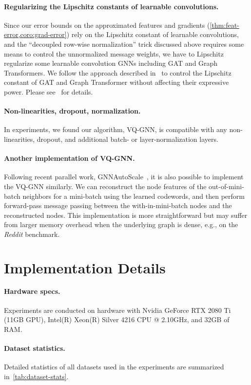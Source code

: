 \documentclass{article}
\newcommand{\cm}{\paragraph}
\begin{document}
\cm{Regularizing the Lipschitz constants of learnable convolutions.}
Since our error bounds on the approximated features and gradients (\cref{thm:feat-error,coro:grad-error}) rely on the Lipschitz constant of learnable convolutions, and the ``decoupled row-wise normalization'' trick discussed above requires some means to control the unnormalized message weights, we have to Lipschitz regularize some learnable convolution GNNs including GAT and Graph Transformers. We follow the approach described in~\citep{dasoulas2021lipschitz} to control the Lipschitz constant of GAT and Graph Transformer without affecting their expressive power. Please see~\citep{dasoulas2021lipschitz} for details.

\cm{Non-linearities, dropout, normalization.}
In experiments, we found our algorithm, VQ-GNN, is compatible with any non-linearities, dropout, and additional batch- or layer-normalization layers.

\cm{Another implementation of VQ-GNN.}
Following recent parallel work, GNNAutoScale~\citep{fey2021gnnautoscale}, it is also possible to implement the VQ-GNN similarly. We can reconstruct the node features of the out-of-mini-batch neighbors for a mini-batch using the learned codewords, and then perform forward-pass message passing between the with-in-mini-batch nodes and the reconstructed nodes. This implementation is more straightforward but may suffer from larger memory overhead when the underlying graph is dense, e.g., on the \textit{Reddit} benchmark.



\section{Implementation Details}
\label{apd:implementation}

\cm{Hardware specs.} Experiments are conducted on hardware with Nvidia GeForce RTX 2080 Ti (11GB GPU), Intel(R) Xeon(R) Silver 4216 CPU @ 2.10GHz, and 32GB of RAM.

\cm{Dataset statistics.}
Detailed statistics of all datasets used in the experiments are summarized in~\cref{tab:dataset-stats}.
\end{document}
